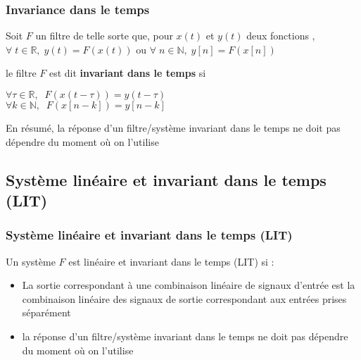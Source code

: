 \documentclass{beamer}
\begin{document}
\begin{frame}
\frametitle{Invariance dans le temps}
Soit $F$ un filtre de telle sorte que, pour $x(t)$ et $y(t)$ deux fonctions ,\\
\vspace{0.2cm} $ \forall \; t \in \mathbb{R}, \; y(t) = F(x(t))$ ou $ \forall \; n \in \mathbb{N}, \; y[n] = F(x[n])$ \\

{
\vspace{1cm} 
le filtre $F$  est dit \textbf{invariant dans le temps} si \\
\vspace{1cm}
\begin{center}
$\forall \tau \in \mathbb{R}, \;\; F(x(t-\tau)) = y(t-\tau)$\\
\vspace{0.7 cm}
$\forall k \in \mathbb{N}, \;\; F(x[n-k]) = y[n-k]$\\
\end{center}
}

{ 
\begin{block}{}
	En résumé, la réponse d'un filtre/système invariant dans le temps ne doit pas dépendre du moment où on l'utilise
\end{block} 
}

\end{frame}


\subsection{Système linéaire et invariant dans le  temps (LIT)}

\begin{frame}
\frametitle{Système linéaire et invariant dans le  temps (LIT) }

Un système $F$ est linéaire et invariant dans le temps (LIT) si :
\vspace{0.3cm}
\begin{itemize}
\item La sortie correspondant à une combinaison linéaire de signaux d'entrée est la combinaison linéaire des signaux de sortie correspondant aux entrées prises séparément\\
\vspace{0.3cm}
\item la réponse d'un filtre/système invariant dans le temps ne doit pas dépendre du moment où on l'utilise\\
\end{itemize}

\end{frame} 
\end{document}
